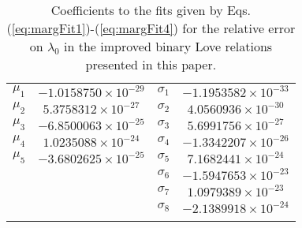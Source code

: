 \documentclass[prd,twocolumn,nofootinbib,superscriptaddress,amsmath,amssymb]{revtex4-1}
\begin{document}
\begin{table}
\centering
\caption{
Coefficients to the fits given by Eqs. (\ref{eq:margFit1})-(\ref{eq:margFit4}) for the relative error on $\lambda_0$ in the improved binary Love relations presented in this paper.
}\label{tab:marginalized}
\addtolength{\tabcolsep}{1pt} 
\begin{tabular}{ c | c || c | c}
\hline 
\noalign{\smallskip}
$\mu_1$ & $-1.0158750\times10^{-29}$ & $\sigma_1$ & $-1.1953582\times10^{-33}$\\
$\mu_2$ & $5.3758312\times10^{-27}$ & $\sigma_2$ & $4.0560936\times10^{-30}$\\
$\mu_3$ & $-6.8500063\times10^{-25}$ & $\sigma_3$ & $5.6991756\times10^{-27}$\\
$\mu_4$ & $1.0235088\times10^{-24}$ & $\sigma_4$ & $-1.3342207\times10^{-26}$\\
$\mu_5$ & $-3.6802625\times10^{-25}$ & $\sigma_5$ & $7.1682441\times10^{-24}$\\
 &  & $\sigma_6$ & $-1.5947653\times10^{-23}$\\
 &  & $\sigma_7$ & $1.0979389\times10^{-23}$\\
 &  & $\sigma_8$ & $-2.1389918\times10^{-24}$\\
 \noalign{\smallskip}
 \hline
\end{tabular}
\addtolength{\tabcolsep}{-1pt}
\end{table}
\end{document}
